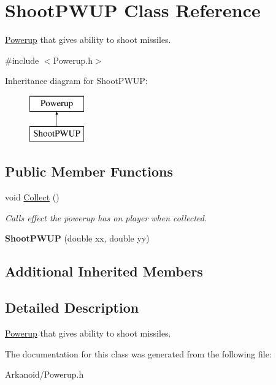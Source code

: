 \hypertarget{class_shoot_p_w_u_p}{}\section{Shoot\+P\+W\+UP Class Reference}
\label{class_shoot_p_w_u_p}


\hyperlink{class_powerup}{Powerup} that gives ability to shoot missiles.  




{\ttfamily \#include $<$Powerup.\+h$>$}

Inheritance diagram for Shoot\+P\+W\+UP\+:\begin{figure}[H]
\begin{center}
\leavevmode
\includegraphics[height=2.000000cm]{class_shoot_p_w_u_p}
\end{center}
\end{figure}
\subsection*{Public Member Functions}
\begin{DoxyCompactItemize}
\item 
\mbox{\label{class_shoot_p_w_u_p_a20a366283557399867950a55c5c2140b}} 
void \hyperlink{class_shoot_p_w_u_p_a20a366283557399867950a55c5c2140b}{Collect} ()
\begin{DoxyCompactList}\small\item\em Calls effect the powerup has on player when collected. \end{DoxyCompactList}\item 
\mbox{\label{class_shoot_p_w_u_p_ac38d8f9467b29a21ef89fe8eb24f80d1}} 
{\bfseries Shoot\+P\+W\+UP} (double xx, double yy)
\end{DoxyCompactItemize}
\subsection*{Additional Inherited Members}


\subsection{Detailed Description}
\hyperlink{class_powerup}{Powerup} that gives ability to shoot missiles. 

The documentation for this class was generated from the following file\+:\begin{DoxyCompactItemize}
\item 
Arkanoid/Powerup.\+h\end{DoxyCompactItemize}

